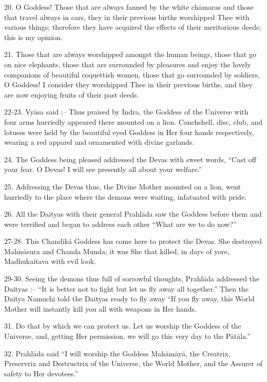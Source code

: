 20. O Goddess! Those that are always fanned by the white ch\=amaras and those that travel always in cars, they in their previous births worshipped Thee with various things; therefore they have acquired the effects of their meritorious deeds; this is my opinion.

21. Those that are always worshipped amongst the human beings, those that go on nice elephants, those that are surrounded by pleasures and enjoy the lovely companions of beautiful coquettish women, those that go surrounded by soldiers, O Goddess! I consider they worshipped Thee in their previous births, and they are now enjoying fruits of their past deeds.

22-23. Vy\=asa said :-- Thus praised by Indra, the Goddess of the Universe with four arms hurriedly appeared there mounted on a lion. Conchshell, disc, club, and lotuses were held by the beautiful eyed Goddess in Her four hands respectively, wearing a red apparel and ornamented with divine garlands.

24. The Goddess being pleased addressed the Devas with sweet words, ``Cast off your fear. O Devas! I will see presently all about your welfare.''

25. Addressing the Devas thus, the Divine Mother mounted on a lion, went hurriedly to the place where the demons were waiting, infatuated with pride.

26. All the Daityas with their general Prahl\=ada saw the Goddess before them and were terrified and began to address each other ``What are we to do now?''

27-28. This Chandik\=a Goddess has come here to protect the Devas. She destroyed Mahi\d{s}\=asura and Chanda Munda; it was She that killed, in days of yore, Madhukaitava with evil look.

29-30. Seeing the demons thus full of sorrowful thoughts, Prahl\=ada addressed the Daityas :-- ``It is better not to fight but let us fly away all together.'' Then the Daitya Namuchi told the Daityas ready to fly away ``If you fly away, this World Mother will instantly kill you all with weapons in Her hands.

31. Do that by which we can protect us. Let us worship the Goddess of the Universe, and, getting Her permission, we will go this very day to the P\=at\=ala.''

32. Prahl\=ada said ``I will worship the Goddess Mah\=am\=ay\=a, the Creatrix, Preservrix and Destructrix of the Universe, the World Mother, and the Assurer of safety to Her devotees.''

